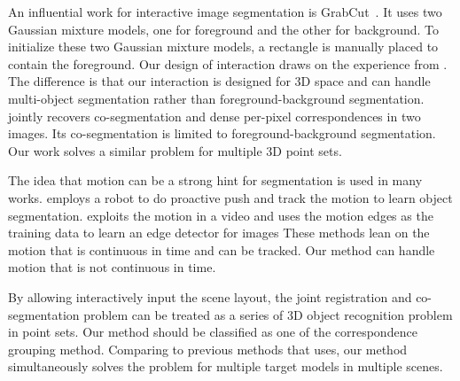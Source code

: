 %
An influential work for interactive image segmentation is GrabCut~\cite{grabcut}. It uses two Gaussian mixture models, one for foreground and the other for background. 
To initialize these two Gaussian mixture models, a rectangle is manually placed to contain the foreground. 
Our design of interaction draws on the experience from \cite{grabcut}. 
%
The difference is that our interaction is designed for 3D space and can handle multi-object segmentation rather than foreground-background segmentation. 
%
\cite{Taniai_2016_CVPR} jointly recovers co-segmentation and dense per-pixel correspondences in two images. 
Its co-segmentation is limited to foreground-background segmentation. Our work solves a similar problem for multiple 3D point sets. 

The idea that motion can be a strong hint for segmentation is used in many works.
\cite{Xu:2015:ACS:2816795.2818075} employs a robot to do proactive push and track the motion to learn object segmentation. 
\cite{unsupervisededge} exploits the motion in a video and uses the motion edges as the training data to learn an edge detector for images
These methods lean on the motion that is continuous in time and can be tracked. Our method can handle motion that is not continuous in time.

By allowing interactively input the scene layout, the joint registration and co-segmentation problem can be treated as a series of 3D object recognition problem in point sets. Our method should be classified as one of the correspondence grouping method. Comparing to previous methods that uses\cite{hough,LOF}, our method simultaneously solves the problem for multiple target models in multiple scenes.
